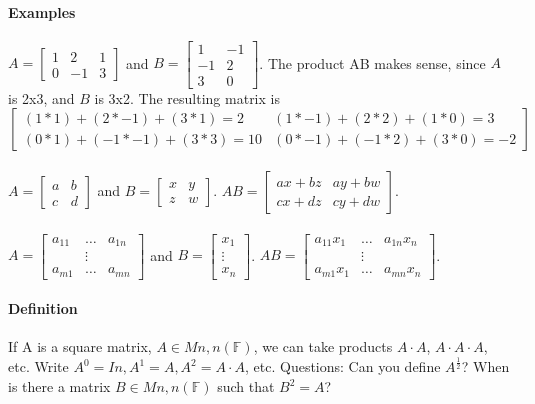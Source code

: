 \documentclass[10pt,letter]{article}
\begin{document}
\paragraph{Examples}
$A = \begin{bmatrix} 1 & 2 & 1 \\ 0 & -1 & 3 \end{bmatrix}$ and $B = \begin{bmatrix} 1 & -1 \\ -1 & 2 \\ 3 & 0\end{bmatrix}$. The product AB makes sense, since $A$ is 2x3, and $B$ is 3x2. The resulting matrix is $\begin{bmatrix}(1*1)+(2*-1)+(3*1)=2 & (1*-1)+(2*2)+(1*0)=3 \\ (0*1)+(-1*-1)+(3*3)= 10 & (0*-1)+(-1*2)+(3*0)=-2 \end{bmatrix}$ \\ \\ 

$A = \begin{bmatrix} a & b  \\ c & d \end{bmatrix}$ and $B = \begin{bmatrix} x & y \\ z & w \end{bmatrix}$. $AB = \begin{bmatrix} ax+bz & ay + bw \\ cx+dz & cy+dw\end{bmatrix}$.  \\ \\ 

$A = \begin{bmatrix} a_{11} & \ldots & a_{1n} \\ &\vdots\\ a_{m1} & \ldots & a_{mn} \end{bmatrix}$ and $B = \begin{bmatrix} x_1 \\ \vdots \\ x_n \end{bmatrix}$. $AB = \begin{bmatrix} a_{11}x_1 & \ldots & a_{1n}x_n \\ &\vdots\\ a_{m1}x_1 & \ldots & a_{mn}x_n \end{bmatrix}$. 

\paragraph{Definition}
If A is a square matrix, $A\in Mn,n(\mathbb{F})$, we can take products $A\cdot A$, $A\cdot A\cdot A$, etc. Write $A^0=In, A^1=A, A^2=A\cdot A$, etc. Questions: Can you define $A^{\frac{1}{2}}$? When is there a matrix $B\in Mn,n(\mathbb{F})$ such that $B^2=A$? 
\end{document}
